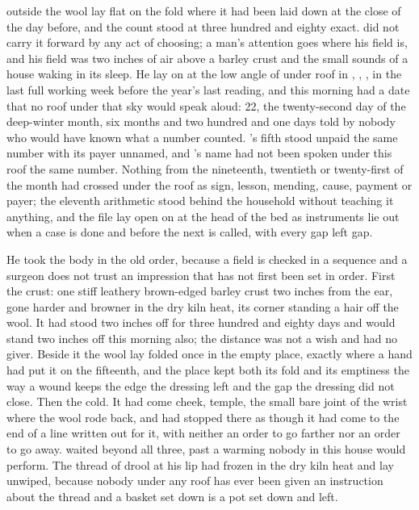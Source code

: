 
 outside the wool lay flat on the fold where it had been laid down at the close of the day before, and the count stood at three hundred and eighty exact.  did not carry it forward by any act of choosing; a man's attention goes where his field is, and his field was two inches of air above a barley crust and the small sounds of a house waking in its sleep. He lay on  at the low angle of  under  roof in , , , in the last full working week before the year's last reading, and this morning had a date that no roof under that sky would speak aloud:  22, the twenty-second day of the deep-winter month, six months and two hundred and one days told by nobody who would have known what a number counted. 's fifth stood unpaid the same number with its payer unnamed, and 's name had not been spoken under this roof the same number. Nothing from the nineteenth, twentieth or twenty-first of the month had crossed under the roof as sign, lesson, mending, cause, payment or payer; the eleventh arithmetic stood behind the household without teaching it anything, and the file lay open on  at the head of the bed as instruments lie out when a case is done and before the next is called, with every gap left gap.

He took the body in the old order, because a field is checked in a sequence and a surgeon does not trust an impression that has not first been set in order. First the crust: one stiff leathery brown-edged barley crust two inches from the ear, gone harder and browner in the dry kiln heat, its corner standing a hair off the wool. It had stood two inches off for three hundred and eighty days and would stand two inches off this morning also; the distance was not a wish and had no giver. Beside it the wool lay folded once in the empty place, exactly where a hand had put it on the fifteenth, and the place kept both its fold and its emptiness the way a wound keeps the edge the dressing left and the gap the dressing did not close. Then the cold. It had come cheek, temple, the small bare joint of the wrist where the wool rode back, and had stopped there as though it had come to the end of a line written out for it, with neither an order to go farther nor an order to go away.  waited beyond all three, past a warming nobody in this house would perform. The thread of drool at his lip had frozen in the dry kiln heat and lay unwiped, because nobody under any roof has ever been given an instruction about the thread and a basket set down is a pot set down and left.

